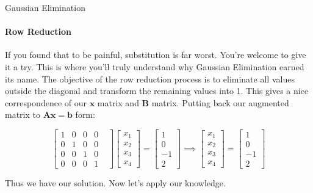 \documentclass{beamer}
\begin{document}
\begin{frame}{Gaussian Elimination}
\framesubtitle{Row Reduction}
If you found that to be painful, substitution is far worst. You're welcome to give it a try. This is where you'll truly understand why Gaussian Elimination earned its name. The objective of the row reduction process is to eliminate all values outside the diagonal and transform the remaining values into 1. This gives a nice correspondence of our $\mathbf{x}$ matrix and $\mathbf{B}$ matrix. Putting back our augmented matrix to $\mathbf{Ax=b}$ form:

\[
\begin{bmatrix}
    1 & 0 & 0 & 0 & \\
    0 & 1 & 0 & 0 & \\
    0 & 0 & 1 & 0 & \\
    0 & 0 & 0 & 1 & 
\end{bmatrix}
\begin{bmatrix}
    x_1 \\
    x_2 \\
    x_3 \\
    x_4
\end{bmatrix}
=
\begin{bmatrix}
    1 \\
    0 \\
    -1 \\
    2
\end{bmatrix}
\implies
\begin{bmatrix}
    x_1 \\
    x_2 \\
    x_3 \\
    x_4
\end{bmatrix}
=
\begin{bmatrix}
    1 \\
    0 \\
    -1 \\
    2
\end{bmatrix}
\]

Thus we have our solution. Now let's apply our knowledge.
\end{frame}
\end{document}
